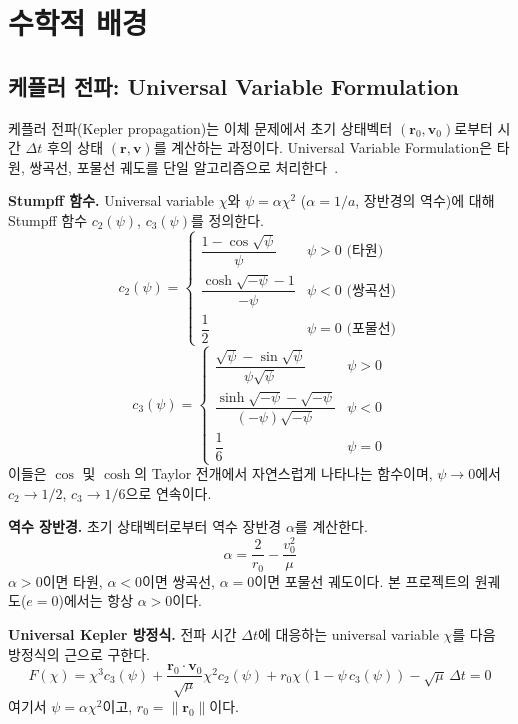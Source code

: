 \documentclass[11pt]{article}
\begin{document}
\section{수학적 배경}
\label{sec:math}

\subsection{케플러 전파: Universal Variable Formulation}
\label{sec:kepler}

케플러 전파(Kepler propagation)는 이체 문제에서 초기 상태벡터 $(\mathbf{r}_0, \mathbf{v}_0)$로부터 시간 $\Delta t$ 후의 상태 $(\mathbf{r}, \mathbf{v})$를 계산하는 과정이다.
Universal Variable Formulation은 타원, 쌍곡선, 포물선 궤도를 단일 알고리즘으로 처리한다~\cite{Curtis2020}.

\textbf{Stumpff 함수.}
Universal variable $\chi$와 $\psi = \alpha \chi^2$ ($\alpha = 1/a$, 장반경의 역수)에 대해 Stumpff 함수 $c_2(\psi)$, $c_3(\psi)$를 정의한다.
\[
c_2(\psi) = \begin{cases}
\dfrac{1 - \cos\sqrt{\psi}}{\psi} & \psi > 0 \text{ (타원)} \\[6pt]
\dfrac{\cosh\sqrt{-\psi} - 1}{-\psi} & \psi < 0 \text{ (쌍곡선)} \\[6pt]
\dfrac{1}{2} & \psi = 0 \text{ (포물선)}
\end{cases}
\]
\[
c_3(\psi) = \begin{cases}
\dfrac{\sqrt{\psi} - \sin\sqrt{\psi}}{\psi\sqrt{\psi}} & \psi > 0 \\[6pt]
\dfrac{\sinh\sqrt{-\psi} - \sqrt{-\psi}}{(-\psi)\sqrt{-\psi}} & \psi < 0 \\[6pt]
\dfrac{1}{6} & \psi = 0
\end{cases}
\]
이들은 $\cos$ 및 $\cosh$의 Taylor 전개에서 자연스럽게 나타나는 함수이며, $\psi \to 0$에서 $c_2 \to 1/2$, $c_3 \to 1/6$으로 연속이다.

\textbf{역수 장반경.}
초기 상태벡터로부터 역수 장반경 $\alpha$를 계산한다.
\[
\alpha = \frac{2}{r_0} - \frac{v_0^2}{\mu}
\]
$\alpha > 0$이면 타원, $\alpha < 0$이면 쌍곡선, $\alpha = 0$이면 포물선 궤도이다.
본 프로젝트의 원궤도($e = 0$)에서는 항상 $\alpha > 0$이다.

\textbf{Universal Kepler 방정식.}
전파 시간 $\Delta t$에 대응하는 universal variable $\chi$를 다음 방정식의 근으로 구한다.
\begin{equation}
F(\chi) = \chi^3 c_3(\psi) + \frac{\mathbf{r}_0 \cdot \mathbf{v}_0}{\sqrt{\mu}} \chi^2 c_2(\psi) + r_0 \chi (1 - \psi\, c_3(\psi)) - \sqrt{\mu}\,\Delta t = 0
\label{eq:universal_kepler}
\end{equation}
여기서 $\psi = \alpha \chi^2$이고, $r_0 = \|\mathbf{r}_0\|$이다.
\end{document}

